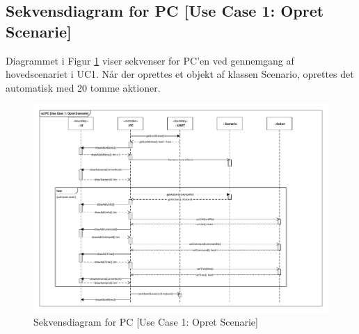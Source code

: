 \subsection{Sekvensdiagram for PC [Use Case 1: Opret Scenarie]}
Diagrammet i Figur \ref{fig:PC_UC1Sek} viser sekvenser for PC'en ved gennemgang af hovedscenariet i UC1. Når der oprettes et objekt af klassen Scenario, oprettes det automatisk med 20 tomme aktioner.

\begin{landscape}
\begin{figure}
	\centering %
	\includegraphics[height=\textwidth - 30 pt,trim=18 15 17 18, clip=true]{Systemarkitektur/Diagrammer/PC_UC1_Sekvens.pdf}%
	\caption{Sekvensdiagram for PC [Use Case 1: Opret Scenarie]}
	\label{fig:PC_UC1Sek}
\end{figure} 

\end{landscape}

\clearpage

